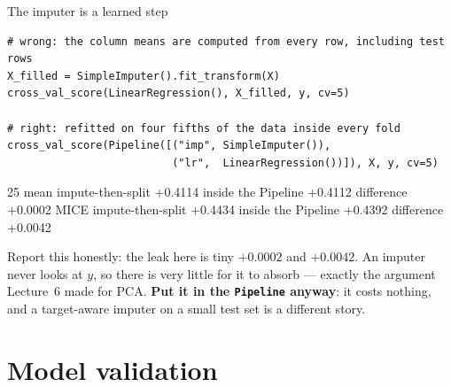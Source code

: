 \documentclass[aspectratio=169]{beamer}
\begin{document}
\begin{frame}[fragile,shrink=8]{The imputer is a learned step}
\begin{lstlisting}
# wrong: the column means are computed from every row, including test rows
X_filled = SimpleImputer().fit_transform(X)
cross_val_score(LinearRegression(), X_filled, y, cv=5)

# right: refitted on four fifths of the data inside every fold
cross_val_score(Pipeline([("imp", SimpleImputer()),
                          ("lr",  LinearRegression())]), X, y, cv=5)
\end{lstlisting}
\begin{outblk}
25%
   mean    impute-then-split +0.4114   inside the Pipeline +0.4112   difference +0.0002
   MICE    impute-then-split +0.4434   inside the Pipeline +0.4392   difference +0.0042
\end{outblk}
\begin{alertblock}{Report this honestly: the leak here is tiny}
  \footnotesize $+0.0002$ and $+0.0042$. An imputer never looks at $y$, so
  there is very little for it to absorb --- exactly the argument Lecture~6
  made for PCA. \textbf{Put it in the \texttt{Pipeline} anyway}: it costs
  nothing, and a target-aware imputer on a small test set is a different
  story.
\end{alertblock}
\end{frame}

\section[Checks]{Model validation}
\label{sec:valid}
\end{document}
